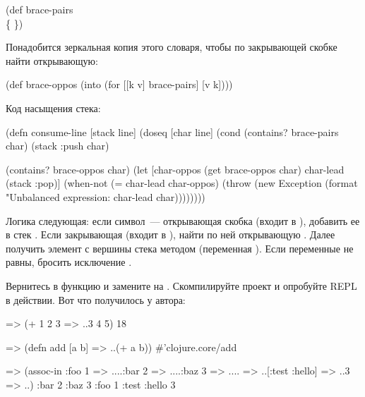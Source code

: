 \begin{english}
  \begin{clojure}
(def brace-pairs
  {\( \)
   \[ \]
   \{ \}})
  \end{clojure}
\end{english}

Понадобится зеркальная копия этого словаря, чтобы по закрывающей скобке найти открывающую:

\begin{english}
  \begin{clojure}
(def brace-oppos
  (into {} (for [[k v] brace-pairs]
             [v k])))
  \end{clojure}
\end{english}

Код насыщения стека:

\begin{english}
  \begin{clojure/lines}
(defn consume-line [stack line]
  (doseq [char line]
    (cond
      (contains? brace-pairs char)
      (stack :push char)

      (contains? brace-oppos char)
      (let [char-oppos
            (get brace-oppos char)
            char-lead
            (stack :pop)]
        (when-not (= char-lead char-oppos)
          (throw
           (new Exception
                (format "Unbalanced expression: %
                        char-lead char))))))))
  \end{clojure/lines}
\end{english}

Логика следующая: если символ~--- открывающая скобка (входит в ), добавить ее в стек . Если закрывающая (входит в ), найти по ней открывающую . Далее получить элемент с вершины стека методом  (переменная ). Если переменные не равны, бросить исключение .

Вернитесь в функцию  и замените  на . Скомпилируйте проект и опробуйте REPL в действии. Вот что получилось у автора:

\begin{english}
  \begin{clojure}
=> (+ 1 2 3
=> ..3 4 5)
18

=> (defn add [a b]
=> ..(+ a b))
#'clojure.core/add

=> (assoc-in {:foo 1
=> ....:bar 2
=> ....:baz 3
=> ....}
=> ..[:test :hello]
=> ..3
=> ..)
{:bar 2 :baz 3 :foo 1 :test {:hello 3}}
  \end{clojure}
\end{english}

